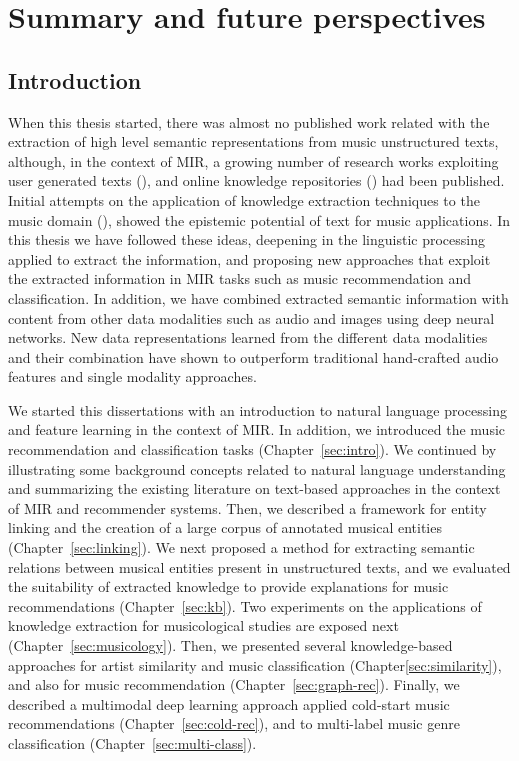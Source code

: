 
\chapter{Summary and future perspectives}
\label{sec:conclusion}

\section{Introduction}

When this thesis started, there was almost no published work related with the extraction of high level semantic representations from music unstructured texts, although, in the context of MIR, a growing number of research works exploiting user generated texts (\cite{Celma2006,lamere2008social,Whitman2002,Knees2013}), and online knowledge repositories (\cite{sordo1788,Celma:ISWC06,dbrec1,Ostuni2013}) had been published. Initial attempts on the application of knowledge extraction techniques to the music domain (\cite{Tata2010,Knees2011,Sordo2012}), showed the epistemic potential of text for music applications. In this thesis we have followed these ideas, deepening in the linguistic processing applied to extract the information, and proposing new approaches that exploit the extracted information in MIR tasks such as music recommendation and classification. In addition, we have combined extracted semantic information with content from other data modalities such as audio and images using deep neural networks. New data representations learned from the different data modalities and their combination have shown to outperform traditional hand-crafted audio features and single modality approaches.

We started this dissertations with an introduction to natural language processing and feature learning in the context of MIR. In addition, we introduced the music recommendation and classification tasks (Chapter~\ref{sec:intro}). We continued by illustrating some background concepts related to natural language understanding and summarizing the existing literature on text-based approaches in the context of MIR and recommender systems. Then, we described a framework for entity linking and the creation of a large corpus of annotated musical entities (Chapter~\ref{sec:linking}). We next proposed a method for extracting semantic relations between musical entities present in unstructured texts, and we evaluated the suitability of extracted knowledge to provide explanations for music recommendations (Chapter~\ref{sec:kb}). Two experiments on the applications of knowledge extraction for musicological studies are exposed next (Chapter~\ref{sec:musicology}). Then, we presented several knowledge-based approaches for artist similarity and music classification (Chapter\ref{sec:similarity}), and also for music recommendation (Chapter~\ref{sec:graph-rec}). Finally, we described a multimodal deep learning approach applied cold-start music recommendations (Chapter~\ref{sec:cold-rec}), and to multi-label music genre classification (Chapter~\ref{sec:multi-class}).

